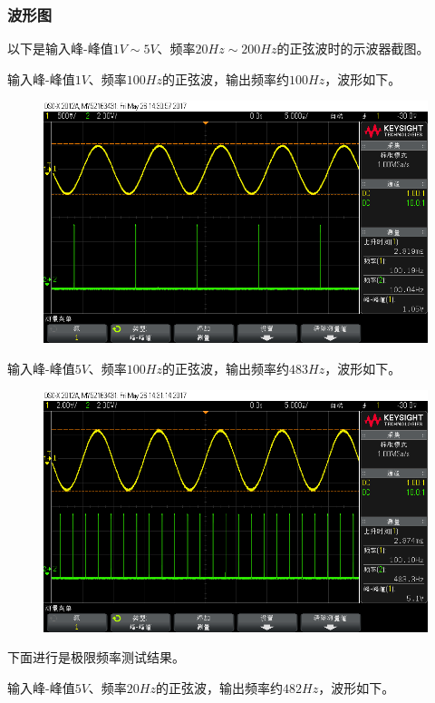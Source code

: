 \documentclass[12pt,a4paper]{article}
\begin{document}
\begin{spacing}{1.3}
\subsubsection{波形图}
以下是输入峰-峰值$1V\sim 5V$、频率$20Hz\sim 200Hz$的正弦波时的示波器截图。\par 
输入峰-峰值$1V、频率100Hz$的正弦波，输出频率约$100Hz$，波形如下。
\begin{figure}[H]
\centering
\includegraphics[width=\textwidth]{scope_0.png}
\end{figure}
输入峰-峰值$5V、频率100Hz的正弦波，输出频率约483Hz$，波形如下。
\begin{figure}[H]
\centering
\includegraphics[width=\textwidth]{scope_1.png}
\end{figure}
下面进行是极限频率测试结果。\par 
输入峰-峰值$5V、频率20Hz的正弦波，输出频率约482Hz$，波形如下。
\begin{figure}[H]
\centering

\end{figure}
\end{spacing}
\end{document}

